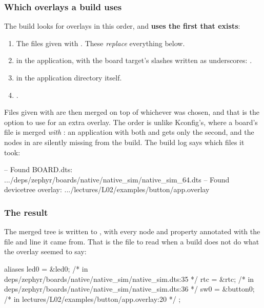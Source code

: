 \subsubsection{Which overlays a build uses}
The build looks for overlays in this order, and \textbf{uses the first that exists}:

\begin{enumerate}
  \item The files given with \textbf{}. These \emph{replace} everything
    below.
  \item \textbf{} in the application, with the board target’s slashes written
    as underscores: .
  \item \textbf{} in the application directory itself.
  \item \textbf{}.
\end{enumerate}

Files given with \textbf{} are then merged on top of
whichever was chosen, and that is the option to use for an extra overlay. The order is unlike
Kconfig’s, where a board’s  file is merged \emph{with} : an application
with both  and  gets only the second,
and the nodes in  are silently missing from the build. The build log says which
files it took:

\begin{console}
-- Found BOARD.dts: .../deps/zephyr/boards/native/native_sim/native_sim_64.dts
-- Found devicetree overlay: .../lectures/L02/examples/button/app.overlay
\end{console}

\subsubsection{The result}
The merged tree is written to \textbf{}, with every node and property
annotated with the file and line it came from. That is the file to read when a build does not do
what the overlay seemed to say:

\begin{dtscode}
aliases {
	led0 = &led0;        /* in deps/zephyr/boards/native/native_sim/native_sim.dts:35 */
	rtc = &rtc;          /* in deps/zephyr/boards/native/native_sim/native_sim.dts:36 */
	sw0 = &button0;      /* in lectures/L02/examples/button/app.overlay:20 */
};
\end{dtscode}

